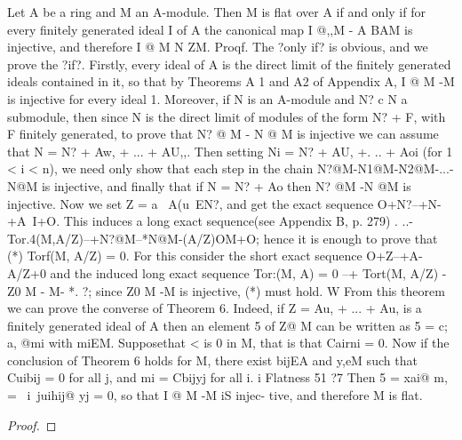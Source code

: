 \begin{theorem}[Theorem 7.7]\label{mcrt-auto-theorem-7-7}\uses{}
\begin{mathematicalrecord}
Let A be a ring and M an A-module. Then M is flat over A if
and only if for every finitely generated ideal I of A the canonical map
I @,,M - A BAM is injective, and therefore I @ M N ZM.
Proqf. The ?only if? is obvious, and we prove the ?if?. Firstly, every ideal
of A is the direct limit of the finitely generated ideals contained in it, so
that by Theorems A 1 and A2 of Appendix A, I @ M -M           is injective for
every ideal 1. Moreover, if N is an A-module and N? c N a submodule,
then since N is the direct limit of modules of the form N? + F, with F
finitely generated, to prove that N? @ M -       N @ M is injective we can
assume that N = N? + Aw, + ... + AU,,. Then setting Ni = N? + AU,
 +. .. + Aoi (for 1 < i < n), we need only show that each step in the
chain
           N?@M-N1@M-N2@M-...-N@M
is injective, and finally that if N = N? + Ao then N? @M -N       @M
is injective. Now we set Z = {a~ A(u~EN?}, and get the exact sequence
           O+N?--+N-+A~I+O.
This induces a long exact sequence(see Appendix B, p. 279)
           . ..-Tor.4(M,A/Z)--+N?@M--*N@M-(A/Z)OM+O;
hence it is enough to prove that
     (*)   Torf(M,      A/Z) = 0.
For this consider the short exact sequence
        O+Z--+A-A/Z+0
and the induced long exact sequence
        Tor:(M, A) = 0 --+ Tort(M, A/Z) -               Z0 M -       M-         *. ?;
since Z0 M -M        is injective, (*) must hold. W
   From this theorem we can prove the converse of Theorem 6. Indeed, if
Z = Au, + ... + Au, is a finitely generated ideal of A then an element 5 of
Z@ M can be written as 5 = c; a, @mi with miEM. Supposethat < is 0 in M,
that is that Cairni = 0. Now if the conclusion of Theorem 6 holds for M,
there exist bijEA and y,eM such that
           Cuibij = 0 for all j,         and   mi = Cbijyj   for all      i.
            i
Flatness                                                              51
?7
Then 5 = xai@ m, = ~i~juihij@           yj = 0, so that I @ M -M        iS injec-
tive, and therefore M is flat.
\end{mathematicalrecord}
\end{theorem}
\begin{proof}
\notready
\end{proof}


